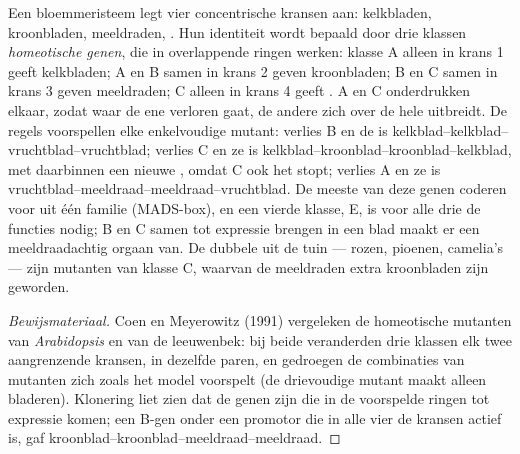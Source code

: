\begin{proposition}\label{prop:b2:plant-flowering:abc}
Een bloemmeristeem legt vier concentrische kransen aan: kelkbladen,
kroonbladen, meeldraden, . Hun identiteit wordt bepaald door
drie klassen \emph{homeotische genen}, die in overlappende ringen werken:
klasse A alleen in krans 1 geeft kelkbladen; A en B samen in krans 2 geven
kroonbladen; B en C samen in krans 3 geven meeldraden; C alleen in krans 4
geeft . A en C onderdrukken elkaar, zodat waar de ene verloren
gaat, de andere zich over de hele  uitbreidt. De regels voorspellen
elke enkelvoudige mutant: verlies B en de  is
kelkblad--kelkblad--vruchtblad--vruchtblad; verlies C en ze is
kelkblad--kroonblad--kroonblad--kelkblad, met daarbinnen een nieuwe ,
omdat C ook het  stopt; verlies A en ze is
vruchtblad--meeldraad--meeldraad--vruchtblad. De meeste van deze genen
coderen voor  uit één familie (MADS-box), en een vierde
klasse, E, is voor alle drie de functies nodig; B en C samen tot expressie
brengen in een blad maakt er een meeldraadachtig orgaan van. De dubbele
 uit de tuin --- rozen, pioenen, camelia's --- zijn mutanten van
klasse C, waarvan de meeldraden extra kroonbladen zijn geworden.
\end{proposition}
\begin{proof}[Bewijsmateriaal]
Coen en Meyerowitz (1991) vergeleken de homeotische mutanten van
\emph{Arabidopsis} en van de leeuwenbek: bij beide veranderden drie klassen
 elk twee aangrenzende kransen, in dezelfde paren, en gedroegen de
combinaties van mutanten zich zoals het model voorspelt (de drievoudige
mutant maakt alleen bladeren). Klonering liet zien dat de genen
 zijn die in de voorspelde ringen tot expressie komen;
een B-gen onder een promotor die in alle vier de kransen actief is, gaf
kroonblad--kroonblad--meeldraad--meeldraad.
\end{proof}

